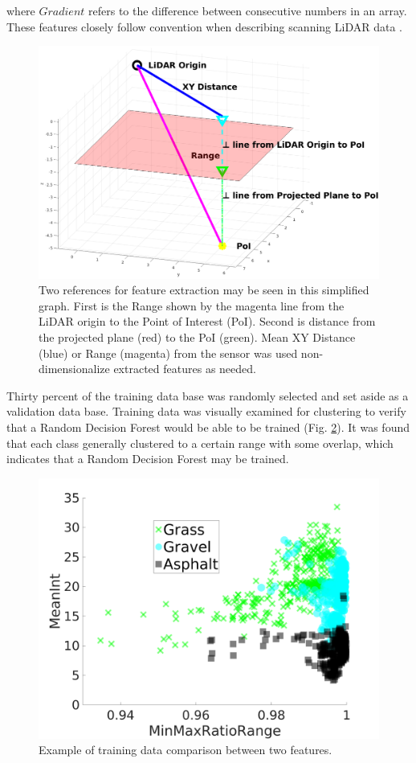 \documentclass[numbered,pdftex]{ohio-etd}
\begin{document}
{{		{where $Gradient$ refers to the difference between consecutive numbers in an array. These features closely follow convention when describing scanning LiDAR data \cite{breiman_random_2001}.}
		
		
		\begin{figure}[H]
			\centering
			\includegraphics[width=1\linewidth]{Defense_Images/xy_vs_range}
			\caption[XY vs Range vs Z Height]{Two references for feature extraction may be seen in this simplified graph. First is the Range shown by the magenta line from the LiDAR origin to the Point of Interest (PoI). Second is distance from the projected plane (red) to the PoI (green). Mean XY Distance (blue) or Range (magenta) from the sensor was used non-dimensionalize extracted features as needed.}
			\label{fig:xy_vs_range}
		\end{figure}
	
		{Thirty percent of the training data base was randomly selected and set aside as a validation data base. Training data was visually examined for clustering to verify that a Random Decision Forest would be able to be trained (Fig. \ref{fig:range_training_data_cluster_3}). It was found that each class generally clustered to a certain range with some overlap, which indicates that a Random Decision Forest may be trained.}
		
		\begin{figure}[H]
			\centering
			\includegraphics[width=0.75\linewidth]{Defense_Images/training_data_cluster_3}
			\caption[Example Clustering]{Example of training data comparison between two features.}
			\label{fig:range_training_data_cluster_3}
		\end{figure}
		
}}
\end{document}
